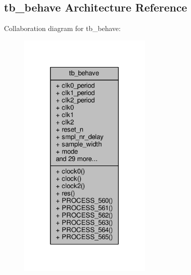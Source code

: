 \subsection{tb\+\_\+behave Architecture Reference}
\label{classtx__path__top__tb_1_1tb__behave}


Collaboration diagram for tb\+\_\+behave\+:\nopagebreak
\begin{figure}[H]
\begin{center}
\leavevmode
\includegraphics[width=182pt]{dc/d5f/classtx__path__top__tb_1_1tb__behave__coll__graph}
\end{center}
\end{figure}
